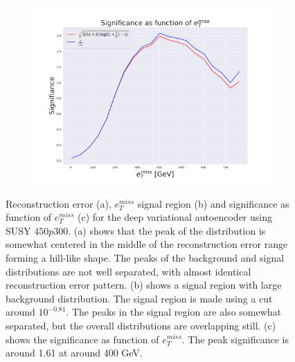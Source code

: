 \begin{figure}[h!]
\begin{subfigure}{.49\textwidth}
        \caption{}
        \label{fig:VAE_2lep_big_etmiss_450}
    \end{subfigure}
    \hfill 
    \begin{subfigure}{.49\textwidth}
        \includegraphics[width=\textwidth]{Figures/VAE_testing/big/2lep/significance_etmiss_450p0p0300_-0.8121874101107931.pdf}
        \caption{}
        \label{fig:VAE_2lep_big_signi_450}
    \end{subfigure}
    \hfill      
    \caption[2lep deep network | $450p300$ | VAE]{Reconstruction error (a), $e_T^{miss}$ signal region (b) and significance as function of 
    $e_T^{miss}$ (c) for the deep variational autoencoder using SUSY $450p300$. 
    (a) shows that the peak of the distribution is somewhat centered in the middle 
    of the reconstruction error range forming a hill-like shape. The peaks of the background and signal 
    distributions are not well separated, with almost identical reconstruction error pattern. (b) 
    shows a signal region with large background distribution. The signal region is made using a cut around
    $10^{-0.81}$. The peaks in the signal region are also somewhat 
    separated, but the overall distributions are overlapping still. 
    (c) shows the significance as function of $e_T^{miss}$. 
    The peak significance is around 1.61 at around 400 GeV.}
    \label{fig:VAE_2lep_big_rec_sig_signi_450}
\end{figure}

